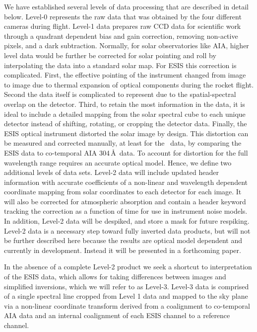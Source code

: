     We have established several levels of data processing that are described in detail below.
    Level-0 represents the raw data that was obtained by the four different cameras during flight.
    Level-1 data prepares raw CCD data for scientific work through a quadrant dependent bias and gain correction, removing non-active pixels, and a dark subtraction.
    Normally, for solar observatories like AIA, higher level data would be further be corrected for solar pointing and roll by interpolating the data into a standard solar map.  
    For ESIS this correction is complicated.  First, the effective pointing of the instrument changed from image to image due to thermal expansion of optical components during the rocket flight.  
    Second the data itself is complicated to represent due to the spatial-spectral overlap on the detector.  
    Third, to retain the most information in the data, it is ideal to include a detailed mapping from the solar spectral cube to each unique detector instead of shifting, rotating, or cropping the detector data.  
    Finally, the ESIS optical instrument distorted the solar image by design. 
    This distortion can be measured and corrected manually, at least for the \ov \ data, by comparing the ESIS data to co-temporal AIA 304\,\AA\ data.  
    To account for  distortion for the full wavelength range requires an accurate optical model.
    Hence, we define two additional levels of data sets.  
    Level-2 data will include updated header information with accurate coefficients of a non-linear and wavelength dependent coordinate mapping from solar coordinates to each detector for each image.   
    It will also be corrected for atmospheric absorption and contain a header keyword tracking the correction as a function of time for use in instrument noise models.
    In addition, Level-2 data will be despiked, and store a mask for future respiking.
    Level-2 data is a necessary step toward fully inverted data products,  but will not be further described here because the results are optical model dependent and currently in development.   
    Instead it will be presented in a forthcoming paper.  

    In the absence of a complete Level-2 product we seek a shortcut to interpretation of the ESIS data, which allows for taking differences between images and simplified inversions, which we will refer to as Level-3.
    Level-3 data is comprised of a single spectral line cropped from Level 1 data and mapped to the sky plane via a non-linear coordinate transform derived from a coalignment to co-temporal AIA data and an internal coalignment of each ESIS channel to a reference channel.
    
